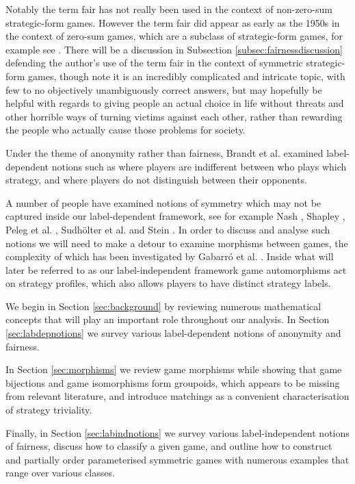 Notably the term fair has not really been used in the context of non-zero-sum strategic-form games. However the term fair did appear as early as the 1950s in the context of zero-sum games, which are a subclass of strategic-form games, for example see \cite{VNM, gelbaum1959symmetric, tucker1962comb}. There will be a discussion in Subsection \ref{subsec:fairnessdiscussion} defending the author's use of the term fair in the context of symmetric strategic-form games, though note it is an incredibly complicated and intricate topic, with few to no objectively unambiguously correct answers, but may hopefully be helpful with regards to giving people an actual choice in life without threats and other horrible ways of turning victims against each other, rather than rewarding the people who actually cause those problems for society.

Under the theme of anonymity rather than fairness, Brandt et al. \cite{brandt2009symmetries} examined label-dependent notions such as where players are indifferent between who plays which strategy, and where players do not distinguish between their opponents.

A number of people have examined notions of symmetry which may not be captured inside our label-dependent framework, see for example Nash \cite{NashNCG}, Shapley \cite{shapley1960symmetric}, Peleg et al. \cite{peleg1999canonical}, Sudh\"{o}lter et al. \cite{sudholter2000canonical} and Stein \cite{NoahXE}. In order to discuss and analyse such notions we will need to make a detour to examine morphisms between games, the complexity of which has been investigated by Gabarr\'{o} et al. \cite{IsoComplexity}. Inside what will later be referred to as our label-independent framework game automorphisms act on strategy profiles, which also allows players to have distinct strategy labels.

We begin in Section \ref{sec:background} by reviewing numerous mathematical concepts that will play an important role throughout our analysis. In Section \ref{sec:labdepnotions} we survey various label-dependent notions of anonymity and fairness. 

In Section \ref{sec:morphisms} we review game morphisms while showing that game bijections and game isomorphisms form groupoids, which appears to be missing from relevant literature, and introduce matchings as a convenient characterisation of strategy triviality. 

Finally, in Section \ref{sec:labindnotions} we survey various label-independent notions of fairness, discuss how to classify a given game, and outline how to construct and partially order parameterised symmetric games with numerous examples that range over various classes.

